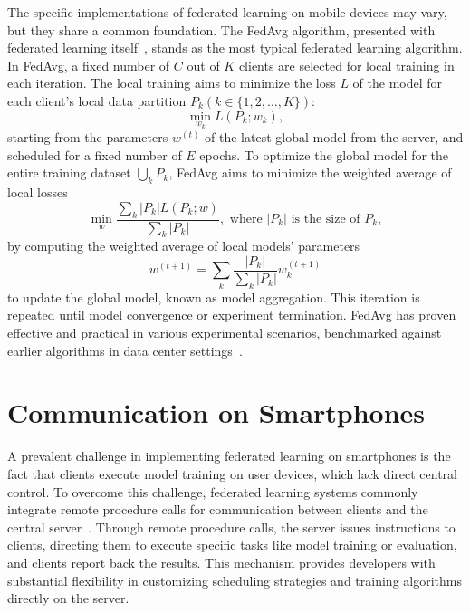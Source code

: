 The specific implementations of federated learning on mobile devices may vary,
but they share a common foundation. The FedAvg algorithm,
presented with federated learning itself~\cite{mcmahan2017communication},
stands as the most typical federated learning algorithm. In FedAvg,
a fixed number of $C$ out of $K$ clients are selected for local training in each
iteration.
The local training aims to minimize the loss $L$ of the model for each client's
local data partition $P_k (k \in \{1, 2, \dots, K\})$:
\begin{equation}
    \min_{w_k} L(P_k;w_k),
\end{equation}
starting from the parameters $w^{(t)}$ of the latest global model from the
server, and scheduled for a fixed number of $E$ epochs.
To optimize the global model for the entire training dataset $\bigcup_k P_k$,
FedAvg aims to minimize the weighted average of local losses
\begin{equation}
    \min_{w} \frac{\sum_k |P_k|L(P_k;w)}{\sum_k |P_k|},
    \text{ where }|P_k|\text{ is the size of }P_k,
\end{equation}
by computing the weighted average of local models' parameters
\begin{equation}
    \label{eq:aggregation}
    w^{(t+1)}=\sum_k \frac{|P_k|}{\sum_k |P_k|}w_k^{(t+1)}
\end{equation}
to update the global model, known as model aggregation.
This iteration is repeated until model convergence or experiment termination.
FedAvg has proven effective and practical in various experimental scenarios,
benchmarked against earlier algorithms in data center
settings~\cite{bonawitz2019towards}.

\section{Communication on Smartphones}

A prevalent challenge in implementing federated learning on smartphones is the
fact that clients execute model training on user devices,
which lack direct central control. To overcome this challenge,
federated learning systems commonly integrate remote procedure calls
for communication between clients and the central
server~\cite{tff,he2020fedml,beutel2020flower,patrick2022openfl,madrigal2023project}.
Through remote procedure calls, the server issues instructions to clients,
directing them to execute specific tasks like model training or evaluation,
and clients report back the results.
This mechanism provides developers with substantial flexibility in customizing
scheduling strategies and training algorithms directly on the server.

